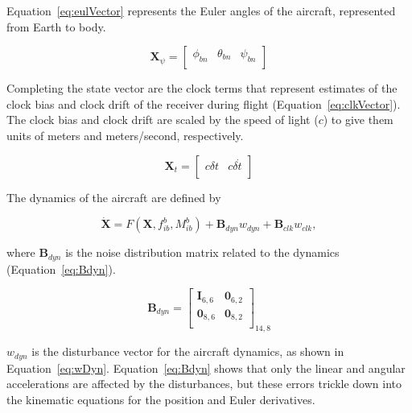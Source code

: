 Equation~\ref{eq:eulVector} represents the Euler angles of the aircraft, represented from Earth to body.

\begin{equation}\label{eq:eulVector}
    \mathbf{X}_{\psi} =
    \begin{bmatrix}
        \phi_{bn} & \theta_{bn} & \psi_{bn} \\
    \end{bmatrix}
\end{equation}

Completing the state vector are the clock terms that represent estimates of the clock bias and clock drift of the receiver during flight (Equation~\ref{eq:clkVector}). The clock bias and clock drift are scaled by the speed of light (\(c\)) to give them units of meters and meters/second, respectively.

\begin{equation}\label{eq:clkVector}
    \mathbf{X}_t = \begin{bmatrix}
        c\delta t & c\delta\dot{t} \\
    \end{bmatrix}
\end{equation}

The dynamics of the aircraft are defined by

\begin{equation}\label{eq:eulerIntegration}
    \dot{\mathbf{X}} = F\left(\mathbf{X},f_{ib}^b,M_{ib}^b\right) + \mathbf{B}_{dyn}w_{dyn} + \mathbf{B}_{clk}w_{clk},
\end{equation}

where \(\mathbf{B}_{dyn}\) is the noise distribution matrix related to the dynamics (Equation~\ref{eq:Bdyn}).

\begin{equation}\label{eq:Bdyn}
    \mathbf{B}_{dyn} =\begin{bmatrix}
        \mathbf{I}_{6,6} & \mathbf{0}_{6,2} \\
        \mathbf{0}_{8,6} & \mathbf{0}_{8,2} \\
    \end{bmatrix}_{14,8}
\end{equation}

\(w_{dyn}\) is the disturbance vector for the aircraft dynamics, as shown in Equation~\ref{eq:wDyn}. Equation~\ref{eq:Bdyn} shows that only the linear and angular accelerations are affected by the disturbances, but these errors trickle down into the kinematic equations for the position and Euler derivatives.

